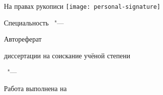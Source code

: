 \thispagestyle{empty}

\vspace{0pt plus1fill} %
\begin{flushright}
  \large{На правах рукописи}
  \texttt{[image: personal-signature]} 
\end{flushright}

\vspace{0pt plus3fill} %
\begin{center}
\textbf {\large \thesisAuthor}
\end{center}

\vspace{0pt plus3fill} %
\begin{center}
\textbf {\Large \thesisTitle}

\vspace{0pt plus3fill} %
{\large Специальность \thesisSpecialtyNumber\ "--- \thesisSpecialtyTitle}

\vspace{0pt plus1.5fill} %
\Large{Автореферат}\par
\large{диссертации на соискание учёной степени\par \thesisDegree}
\end{center}

\vspace{0pt plus4fill} %
\begin{center}
{\large{\thesisCity\ "--- \thesisYear}}
\end{center}

\newpage
\thispagestyle{empty}
\noindent Работа выполнена на \thesisWhere

